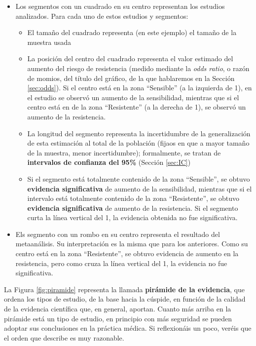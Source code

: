 \documentclass[
]{book}
\providecommand{\tightlist}{%
  \setlength{\itemsep}{0pt}\setlength{\parskip}{0pt}}
\theoremstyle{definition}
\theoremstyle{definition}
\theoremstyle{definition}
\theoremstyle{definition}
\theoremstyle{remark}
\begin{document}
\begin{itemize}
\item
  Los segmentos con un cuadrado en su centro representan los estudios analizados. Para cada uno de estos estudios y segmentos:

  \begin{itemize}
  \tightlist
  \item
    El tamaño del cuadrado representa (en este ejemplo) el tamaño de la muestra usada
  \item
    La posición del centro del cuadrado representa el valor estimado del aumento del riesgo de resistencia (medido mediante la \emph{odds ratio}, o razón de momios, del título del gráfico, de la que hablaremos en la Sección \ref{sec:odds}). Si el centro está en la zona ``Sensible'' (a la izquierda de 1), en el estudio se observó un aumento de la sensibilidad, mientras que si el centro está en de la zona ``Resistente'' (a la derecha de 1), se observó un aumento de la resistencia.
  \item
    La longitud del segmento representa la incertidumbre de la generalización de esta estimación al total de la población (fijaos en que a mayor tamaño de la muestra, menor incertidumbre); formalmente, se tratan de \textbf{intervalos de confianza del 95\%} (Sección \ref{sec:IC})
  \item
    Si el segmento está totalmente contenido de la zona ``Sensible'', se obtuvo \textbf{evidencia significativa} de aumento de la sensibilidad, mientras que si el intervalo está totalmente contenido de la zona ``Resistente'', se obtuvo \textbf{evidencia significativa} de aumento de la resistencia. Si el segmento curta la línea vertical del 1, la evidencia obtenida no fue significativa.
  \end{itemize}
\item
  Els segmento con un rombo en su centro representa el resultado del metaanálisis. Su interpretación es la misma que para los anteriores. Como su centro está en la zona ``Resistente'', se obtuvo evidencia de aumento en la resistencia, pero como cruza la línea vertical del 1, la evidencia no fue significativa.
\end{itemize}

La Figura \ref{fig:piramide} representa la llamada \textbf{pirámide de la evidencia}, que ordena los tipos de estudio, de la base hacia la cúspide, en función de la calidad de la evidencia científica que, en general, aportan. Cuanto más arriba en la pirámide está un tipo de estudio, en principio con más seguridad se pueden adoptar sus conclusiones en la práctica médica. Si reflexionáis un poco, veréis que el orden que describe es muy razonable.
\end{document}
